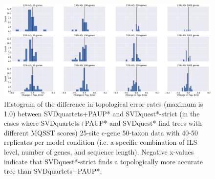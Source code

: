 \begin{figure}
\includegraphics[width=\textwidth]{svdquest-figs/differentscore-rfdists-hist-cgenes-25bps.eps}
\caption[Histogram of differences in topological error rates between SVDquartets+PAUP* and SVDquest*-strict for the 25-site 50-taxon datasets]{Histogram of the difference in topological error rates (maximum is 1.0)  between
  SVDquartets+PAUP* and SVDquest*-strict (in the cases where SVDquartets+PAUP* and SVDquest* find trees with different MQSST scores)  25-site c-gene 50-taxon data
  with 40-50 replicates per model condition (i.e. a specific combination of ILS level, number of genes, and sequence length). 
  Negative x-values 
  indicate that SVDquest*-strict finds a topologically more accurate tree than
  SVDquartets+PAUP*.}
  \label{fig:s7}
\end{figure}





